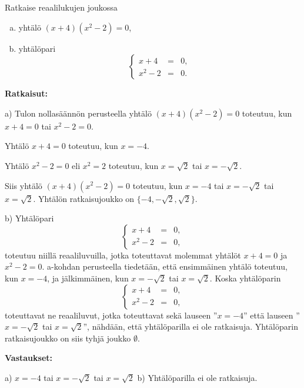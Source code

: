 \begin{esimerkki}
Ratkaise reaalilukujen joukossa
\begin{enumerate}[a)]
\item yhtälö $(x + 4)(x^2 - 2) = 0$,
\item yhtälöpari
\[
\left\{
\begin{array}{rcl}
x + 4 & = & 0, \\
x^2 - 2 & = & 0.
\end{array}\right.
\]
\end{enumerate}

{\bf Ratkaisut:}

a) Tulon nollasäännön perusteella yhtälö $(x + 4)(x^2 -
2) = 0$ toteutuu, kun $x + 4 = 0$ tai $x^2 - 2 = 0$.

Yhtälö $x + 4 = 0$ toteutuu, kun $x = -4$.

Yhtälö $x^2 - 2 = 0$ eli $x^2 = 2$ toteutuu, kun $x =
\sqrt{2}$ tai $x = -\sqrt{2}$.

Siis yhtälö $(x + 4)(x^2 - 2) = 0$ toteutuu, kun $x =
-4$ tai $x = -\sqrt{2}$ tai $x = \sqrt{2}$. Yhtälön
ratkaisujoukko on $\{-4, -\sqrt{2}, \sqrt{2} \}$.

b) Yhtälöpari
\[
\left\{
\begin{array}{rcl}
x + 4 & = & 0, \\
x^2 - 2 & = & 0,
\end{array}\right.
\]
toteutuu niillä reaaliluvuilla, jotka toteuttavat
molemmat yhtälöt $x + 4 = 0$ ja $x^2 - 2 = 0$. a-kohdan
perusteella tiedetään, että ensimmäinen yhtälö toteutuu,
kun $x = -4$, ja jälkimmäinen, kun $x = -\sqrt{2}$ tai $x
= \sqrt{2}$. Koska yhtälöparin
\[
\left\{
\begin{array}{rcl}
x + 4 & = & 0, \\
x^2 - 2 & = & 0,
\end{array}\right.
\]
toteuttavat ne reaaliluvut, jotka toteuttavat sekä
lauseen ''$x = -4$'' että lauseen ''$x = -\sqrt{2}$ tai
$x = \sqrt{2}$'', nähdään, että yhtälöparilla ei ole
ratkaisuja. Yhtälöparin ratkaisujoukko on siis tyhjä
joukko $\emptyset$.

{\bf Vastaukset:}

a) $x = -4$ tai $x = -\sqrt{2}$ tai $x = \sqrt{2}$
b) Yhtälöparilla ei ole ratkaisuja.
\end{esimerkki}


